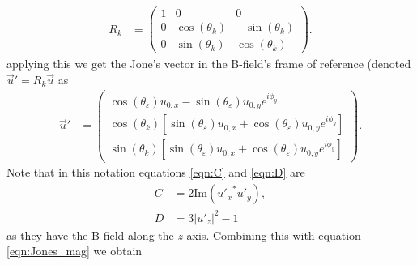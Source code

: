 \documentclass{article}
\begin{document}
\begin{align}
    R_k &= \begin{pmatrix}
 1& 0 & 0 \\
 0 & \cos(\theta_k) & -\sin(\theta_k) \\
 0 & \sin(\theta_k) & \cos(\theta_k)
\end{pmatrix}.
\end{align}
applying this we get the Jone's vector in the B-field's frame of reference (denoted \(\vec{u}'= R_k \vec{u}\) as
\begin{align}
    \vec{u}' &= \begin{pmatrix}
    \cos(\theta_\varepsilon) u_{0,x} -\sin(\theta_\varepsilon) u_{0,y} e^{i \phi_y}\\
    \cos(\theta_k) \left[\sin(\theta_\varepsilon) u_{0,x} +\cos(\theta_\varepsilon) u_{0,y} e^{i \phi_y}\right] \\
    \sin(\theta_k) \left[\sin(\theta_\varepsilon) u_{0,x} +\cos(\theta_\varepsilon) u_{0,y} e^{i \phi_y}\right] 
\end{pmatrix}.\label{eqn:Jones_mag}
\end{align}
Note that in this notation equations \ref{eqn:C} and \ref{eqn:D} are
\begin{align}
    C &= 2 \text{Im}({u'_x}^* u'_y),\\
    D &= 3|u'_z|^2 -1
\end{align}
as they have the B-field along the \(z\)-axis. Combining this with equation \ref{eqn:Jones_mag} we obtain
\end{document}
